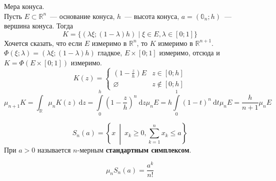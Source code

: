 \documentclass{article}
\begin{document}
    \begin{example}
        Мера конуса.\\
        Пусть $E\subset\mathbb R^n$~--- основание конуса, $h$~--- высота конуса, $a=(\mathbb0_n;h)$~--- вершина конуса. Тогда
        $$
        K=\{(\lambda\xi;(1-\lambda)h)\mid\xi\in E,\lambda\in[0;1]\}
        $$
        Хочется сказать, что если $E$ измеримо в $\mathbb R^n$, то $K$ измеримо в $\mathbb R^{n+1}$. $\Phi(\xi;\lambda)=(\lambda\xi;(1-\lambda)h)$ гладкое, $E\times[0;1]$ измеримо, отсюда и $K=\Phi(E\times[0;1])$ измеримо.\\
        $$
        K(z)=\begin{cases}
            \left(1-\frac zh\right)E&z\in[0;h]\\
            \varnothing&z\notin[0;h]
        \end{cases}
        $$
        $$
        \mu_{n+1}K=\int_{\mathbb R}\mu_nK(z)~\mathrm dz=\int\limits_0^h\left(1-\frac zh\right)^n~\mathrm dz\mu_n E=h\int\limits_0^1(1-t)^n~\mathrm dt\mu_nE=\frac h{n+1}\mu_nE
        $$
    \end{example}
    \begin{definition}
        $$
        S_n(a)=\left\{x~\middle|~x_k\geqslant 0,\sum\limits_{k=1}^nx_k\leqslant a\right\}
        $$
        При $a>0$ называется $n$-мерным \textbf{стандартным симплексом}.
    \end{definition}
    \begin{property}
        $$\mu_nS_n(a)=\frac{a^k}{n!}$$
    \end{property}
\end{document}
